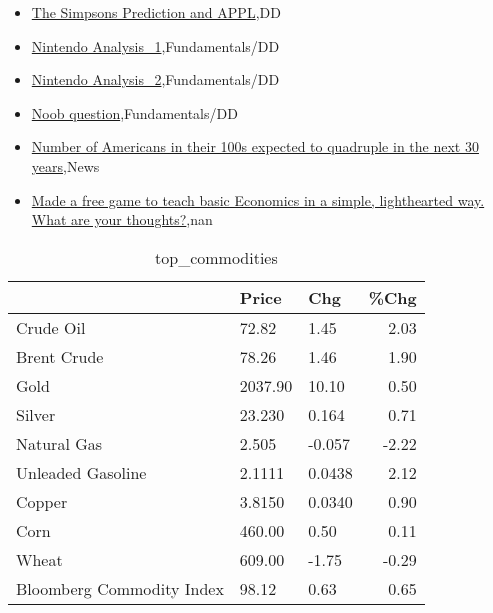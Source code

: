 \documentclass{article}%
\begin{document}
%
\begin{itemize}%
\item%
\href{https://reddit.com/r/wallstreetbets/comments/1940jeq/the\_simpsons\_prediction\_and\_appl/}{The Simpsons Prediction and APPL},DD%
\item%
\href{https://reddit.com/r/StockMarket/comments/193rqsm/nintendo\_analysis\_1/}{Nintendo Analysis\_1},Fundamentals/DD%
\item%
\href{https://reddit.com/r/StockMarket/comments/193rnfn/nintendo\_analysis\_2/}{Nintendo Analysis\_2},Fundamentals/DD%
\item%
\href{https://reddit.com/r/StockMarket/comments/193pbt0/noob\_question/}{Noob question},Fundamentals/DD%
\item%
\href{https://reddit.com/r/Economics/comments/193tw4r/number\_of\_americans\_in\_their\_100s\_expected\_to/}{Number of Americans in their 100s expected to quadruple in the next 30 years},News%
\item%
\href{https://reddit.com/r/Economics/comments/193ozo4/made\_a\_free\_game\_to\_teach\_basic\_economics\_in\_a/}{Made a free game to teach basic Economics in a simple, lighthearted way. What are your thoughts?},nan%
\end{itemize}%


\begin{table}[htbp]%
\caption{top\_commodities}%
\centering%
\begin{adjustbox}{width=1\textwidth}%
\begin{tabular}{lllr}
\toprule
                          &   Price &    Chg &  \%Chg \\
\midrule
               Crude Oil  &   72.82 &   1.45 &  2.03 \\
             Brent Crude  &   78.26 &   1.46 &  1.90 \\
                    Gold  & 2037.90 &  10.10 &  0.50 \\
                  Silver  &  23.230 &  0.164 &  0.71 \\
             Natural Gas  &   2.505 & -0.057 & -2.22 \\
       Unleaded Gasoline  &  2.1111 & 0.0438 &  2.12 \\
                  Copper  &  3.8150 & 0.0340 &  0.90 \\
                    Corn  &  460.00 &   0.50 &  0.11 \\
                   Wheat  &  609.00 &  -1.75 & -0.29 \\
Bloomberg Commodity Index &   98.12 &   0.63 &  0.65 \\
\bottomrule
\end{tabular}
%
\end{adjustbox}%
\end{table}
\end{document}
